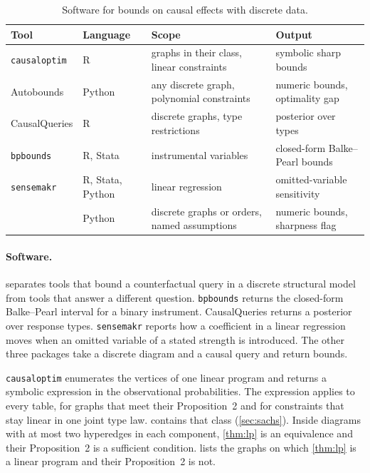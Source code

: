 \begin{table}[t]
\centering
\caption{Software for bounds on causal effects with discrete data.}
\label{tab:software}
\small
\begin{tabular}{@{}*{4}{>{\raggedright\arraybackslash}p{}}@{}}
\toprule
Tool & Language & Scope & Output \\
\midrule
\texttt{causaloptim} \newline \citep{symbolicbounds2023general} & R
  & graphs in their class, linear constraints & symbolic sharp bounds \\
Autobounds \newline \citep{duarte2024automated} & Python
  & any discrete graph, polynomial constraints & numeric bounds, optimality gap \\
CausalQueries \newline \citep{humphreys2023integrated} & R
  & discrete graphs, type restrictions & posterior over types \\
\texttt{bpbounds} \newline \citep{palmer2011nonparametric} & R, Stata
  & instrumental variables & closed-form Balke--Pearl bounds \\
\texttt{sensemakr} \newline \citep{cinelli2020making} & R, Stata, Python
  & linear regression & omitted-variable sensitivity \\
\pid{} & Python
  & discrete graphs or orders, named assumptions & numeric bounds, sharpness flag \\
\bottomrule
\end{tabular}
\end{table}

\paragraph{Software.}
 separates tools that bound a counterfactual query in a
discrete structural model from tools that answer a different question.
\texttt{bpbounds} returns the closed-form Balke--Pearl interval for a binary
instrument. CausalQueries returns a posterior over response types.
\texttt{sensemakr} reports how a coefficient in a linear regression moves
when an omitted variable of a stated strength is introduced. The other three
packages take a discrete diagram and a causal query and return bounds.

\texttt{causaloptim} enumerates the vertices of one linear program and
returns a symbolic expression in the observational probabilities. The
expression applies to every table, for graphs that meet their
Proposition~2 and for constraints that stay linear in one joint type law.
 contains that class (\cref{sec:sachs}). Inside diagrams with
at most two hyperedges in each component, \cref{thm:lp} is an equivalence
and their Proposition~2 is a sufficient condition.  lists the
graphs on which \cref{thm:lp} is a linear program and their Proposition~2 is not.

